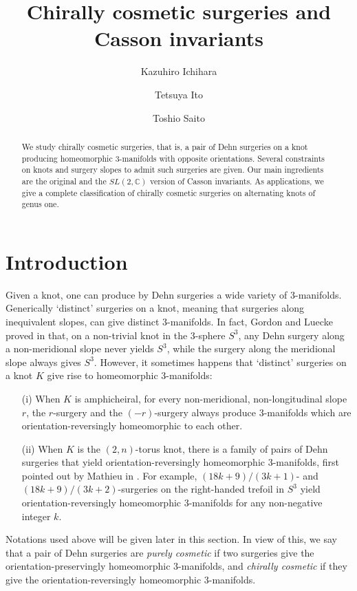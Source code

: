 \documentclass{amsart}
\title{Chirally cosmetic surgeries and Casson invariants}
\author{Kazuhiro Ichihara}
\author{Tetsuya Ito}
\author{Toshio Saito}
\theoremstyle{remark}
\theoremstyle{definition}
\begin{document}
\begin{abstract}
We study chirally cosmetic surgeries, that is, a pair of Dehn surgeries on a knot producing homeomorphic 3-manifolds with opposite orientations. 
Several constraints on knots and surgery slopes to admit such surgeries are given. 
Our main ingredients are the original and the $SL(2,\mathbb{C})$ version of Casson invariants. 
As applications, we give a complete classification of chirally cosmetic surgeries on alternating knots of genus one.
\end{abstract}


\maketitle

\section{Introduction}

Given a knot, one can produce by Dehn surgeries a wide variety of 3-manifolds. 
Generically `distinct' surgeries on a knot, meaning that surgeries along inequivalent slopes, can give distinct 3-manifolds. 
In fact, Gordon and Luecke proved in \cite{GordonLuecke} that, on a non-trivial knot in the 3-sphere $S^3$, 
any Dehn surgery along a non-meridional slope never yields $S^3$, while the surgery along the meridional slope always gives $S^3$. 
However, it sometimes happens that `distinct' surgeries on a knot $K$ give rise to homeomorphic 3-manifolds: 
\begin{itemize}
\item[(i)] When $K$ is amphicheiral, for every non-meridional, non-longitudinal slope $r$, 
the $r$-surgery and the $(-r)$-surgery always produce 3-manifolds which are orientation-reversingly homeomorphic to each other.
\item[(ii)] When $K$ is the $(2,n)$-torus knot, there is a family of pairs of Dehn surgeries that yield orientation-reversingly homeomorphic 3-manifolds, 
first pointed out by Mathieu in \cite{Mathieu90, Mathieu92}. 
For example, $(18k+9)/(3k+1)$- and $(18k+9)/(3k+2)$-surgeries on the right-handed trefoil in $S^3$ yield orientation-reversingly homeomorphic 3-manifolds 
for any non-negative integer $k$. 
\end{itemize}
Notations used above will be given later in this section. In view of this, we say that a pair of Dehn surgeries are \emph{purely cosmetic} 
if two surgeries give the orientation-preservingly homeomorphic 3-manifolds, and \emph{chirally cosmetic} if they give the orientation-reversingly homeomorphic 3-manifolds.
\end{document}
